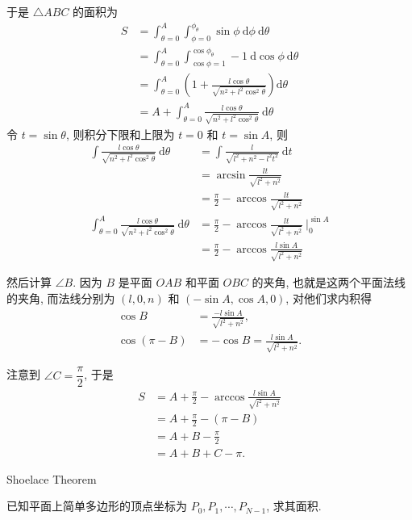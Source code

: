 于是 $\triangle ABC$ 的面积为 
\begin{align*}
S &= \int_{\theta=0}^A\int_{\phi=0}^{\phi_\theta} \sin\phi\ \mathrm{d}\phi\ \mathrm{d}\theta \\
&= \int_{\theta=0}^A \int_{\cos\phi=1}^{\cos\phi_\theta} -1\ \mathrm{d}\cos\phi\ \mathrm{d}\theta \\
&= \int_{\theta=0}^A \left( 1 + \frac{l\cos\theta}{\sqrt{n^2+l^2\cos^2\theta}} \right)\mathrm{d}\theta \\
&= A + \int_{\theta=0}^A \frac{l\cos\theta}{\sqrt{n^2+l^2\cos^2\theta}}\ \mathrm{d}\theta
\end{align*}
令 $t=\sin\theta$, 则积分下限和上限为 $t = 0$ 和 $t = \sin A$, 则
\begin{align*}
\int \frac{l\cos\theta}{\sqrt{n^2+l^2\cos^2\theta}}\ \mathrm{d}\theta &= \int \frac{l}{\sqrt{l^2+n^2-l^2t^2}}\ \mathrm{d}t\\
&= \arcsin\frac{lt}{\sqrt{l^2+n^2}} \\
&= \frac{\pi}{2} - \arccos\frac{lt}{\sqrt{l^2+n^2}}\\
\int_{\theta=0}^A \frac{l\cos\theta}{\sqrt{n^2+l^2\cos^2\theta}}\ \mathrm{d}\theta &= \frac{\pi}{2} - \arccos\frac{lt}{\sqrt{l^2+n^2}}\ \bigg|_0^{\sin A} \\
&= \frac{\pi}{2} - \arccos\frac{l\sin A}{\sqrt{l^2+n^2}}
\end{align*}

然后计算 $\angle B$. 因为 $B$ 是平面 $OAB$ 和平面 $OBC$ 的夹角, 也就是这两个平面法线的夹角, 而法线分别为 $(l,0,n)$ 和 $(-\sin A, \cos A, 0)$, 对他们求内积得
\begin{align*}
\cos B &= \frac{-l \sin A}{\sqrt{l^2+n^2}}, \\
\cos(\pi-B) &= -\cos B = \frac{l \sin A}{\sqrt{l^2+n^2}}.
\end{align*}

注意到 $\angle C = \dfrac{\pi}{2}$, 于是
\begin{align*}
S &= A + \frac{\pi}{2} - \arccos\frac{l\sin A}{\sqrt{l^2+n^2}} \\
&= A + \frac{\pi}{2} - (\pi - B) \\
& = A + B - \frac{\pi}{2} \\
& = A + B + C - \pi.
\end{align*}


\newpage
\noindent Shoelace Theorem

已知平面上简单多边形的顶点坐标为 $P_0, P_1, \cdots, P_{N-1}$, 求其面积.


